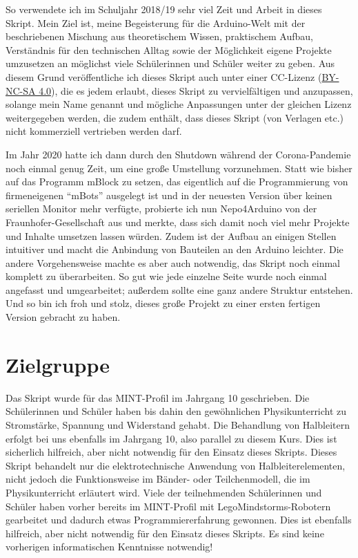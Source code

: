 So verwendete ich im Schuljahr 2018/19 sehr viel Zeit und Arbeit in dieses Skript. Mein Ziel ist, meine Begeisterung für die Arduino-Welt mit der beschriebenen Mischung aus theoretischem Wissen, praktischem Aufbau, Verständnis für den technischen Alltag sowie der Möglichkeit eigene Projekte umzusetzen an möglichst viele Schülerinnen und Schüler weiter zu geben. Aus diesem Grund veröffentliche ich dieses Skript auch unter einer CC-Lizenz (\href{https://creativecommons.org/licenses/by-nc-sa/4.0/deed.de}{BY-NC-SA 4.0}), die es jedem erlaubt, dieses Skript zu vervielfältigen und anzupassen, solange mein Name genannt und mögliche Anpassungen unter der gleichen Lizenz weitergegeben werden, die zudem enthält, dass dieses Skript (von Verlagen etc.) nicht kommerziell vertrieben werden darf.

Im Jahr 2020 hatte ich dann durch den Shutdown während der Corona-Pandemie noch einmal genug Zeit, um eine große Umstellung vorzunehmen. Statt wie bisher auf das Programm mBlock zu setzen, das eigentlich auf die Programmierung von firmeneigenen \enquote{mBots} ausgelegt ist und in der neuesten Version über keinen seriellen Monitor mehr verfügte, probierte ich nun Nepo4Arduino von der Fraunhofer-Gesellschaft aus und merkte, dass sich damit noch viel mehr Projekte und Inhalte umsetzen lassen würden. Zudem ist der Aufbau an einigen Stellen intuitiver und macht die Anbindung von Bauteilen an den Arduino leichter. Die andere Vorgehensweise machte es aber auch notwendig, das Skript noch einmal komplett zu überarbeiten. So gut wie jede einzelne Seite wurde noch einmal angefasst und umgearbeitet; außerdem sollte eine ganz andere Struktur entstehen. Und so bin ich froh und stolz, dieses große Projekt zu einer ersten fertigen Version gebracht zu haben.

\section{Zielgruppe}

Das Skript wurde für das MINT-Profil im Jahrgang 10 geschrieben. Die Schülerinnen und Schüler haben bis dahin den gewöhnlichen Physikunterricht zu Stromstärke, Spannung und Widerstand gehabt. Die Behandlung von Halbleitern erfolgt bei uns ebenfalls im Jahrgang 10, also parallel zu diesem Kurs. Dies ist sicherlich hilfreich, aber nicht notwendig für den Einsatz dieses Skripts. Dieses Skript behandelt nur die elektrotechnische Anwendung von Halbleiterelementen, nicht jedoch die Funktionsweise im Bänder- oder Teilchenmodell, die im Physikunterricht erläutert wird. Viele der teilnehmenden Schülerinnen und Schüler haben vorher bereits im MINT-Profil mit LegoMindstorms-Robotern gearbeitet und dadurch etwas Programmiererfahrung gewonnen. Dies ist ebenfalls hilfreich, aber nicht notwendig für den Einsatz dieses Skripts. Es sind keine vorherigen informatischen Kenntnisse notwendig!

